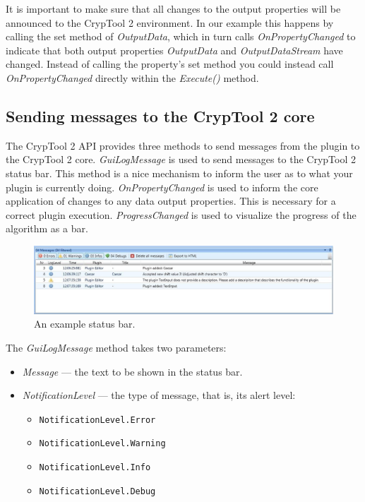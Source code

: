 It is important to make sure that all changes to the output properties will be announced to the CrypTool 2 environment. In our example this happens by calling the set method of \textit{OutputData}, which in turn calls \textit{OnPropertyChanged} to indicate that both output properties \textit{OutputData} and \textit{OutputDataStream} have changed. Instead of calling the property's set method you could instead call \textit{OnPropertyChanged} directly within the \textit{Execute()} method.

\subsection{Sending messages to the CrypTool 2 core}
\label{sec:SendingMessagesToTheCrypTool2Core}

The CrypTool 2 API provides three methods to send messages from the plugin to the CrypTool 2 core. \textit{GuiLogMessage} is used to send messages to the CrypTool 2 status bar. This method is a nice mechanism to inform the user as to what your plugin is currently doing. \textit{OnPropertyChanged} is used to inform the core application of changes to any data output properties. This is necessary for a correct plugin execution. \textit{ProgressChanged} is used to visualize the progress of the algorithm as a bar.

\begin{figure}[h]
	\centering
		\includegraphics[width=1.00\textwidth]{figures/status_bar.jpg}
	\caption{An example status bar.}
	\label{fig:status_bar}
\end{figure}

The \textit{GuiLogMessage} method takes two parameters:

\begin{itemize}
	\item \textit{Message} --- the text to be shown in the status bar.
	\item \textit{NotificationLevel} --- the type of message, that is, its alert level:
	\begin{itemize}
		\item \texttt{NotificationLevel.Error}
		\item \texttt{NotificationLevel.Warning}
		\item \texttt{NotificationLevel.Info}
		\item \texttt{NotificationLevel.Debug}
	\end{itemize}
\end{itemize}

